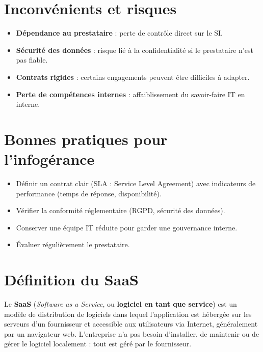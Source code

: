 \documentclass[a4paper,11pt]{article}
\begin{document}
\section*{Inconvénients et risques}

\begin{tcolorbox}[title={Points de vigilance}]
\begin{itemize}
  \item \textbf{Dépendance au prestataire} : perte de contrôle direct sur le SI.
  \item \textbf{Sécurité des données} : risque lié à la confidentialité si le prestataire n’est pas fiable.
  \item \textbf{Contrats rigides} : certains engagements peuvent être difficiles à adapter.
  \item \textbf{Perte de compétences internes} : affaiblissement du savoir-faire IT en interne.
\end{itemize}
\end{tcolorbox}

\section*{Bonnes pratiques pour l’infogérance}

\begin{tcolorbox}[title={Recommandations}]
\begin{itemize}
  \item Définir un contrat clair (SLA : Service Level Agreement) avec indicateurs de performance (temps de réponse, disponibilité).
  \item Vérifier la conformité réglementaire (RGPD, sécurité des données).
  \item Conserver une équipe IT réduite pour garder une gouvernance interne.
  \item Évaluer régulièrement le prestataire.
\end{itemize}
\end{tcolorbox}


\section*{Définition du SaaS}

\begin{tcolorbox}[title={SaaS}]
Le \textbf{SaaS} (\emph{Software as a Service}, ou \textbf{logiciel en tant que service}) est un modèle de distribution de logiciels dans lequel l’application est hébergée sur les serveurs d’un fournisseur et accessible aux utilisateurs via Internet, généralement par un navigateur web.  
L’entreprise n’a pas besoin d’installer, de maintenir ou de gérer le logiciel localement : tout est géré par le fournisseur.
\end{tcolorbox}
\end{document}
